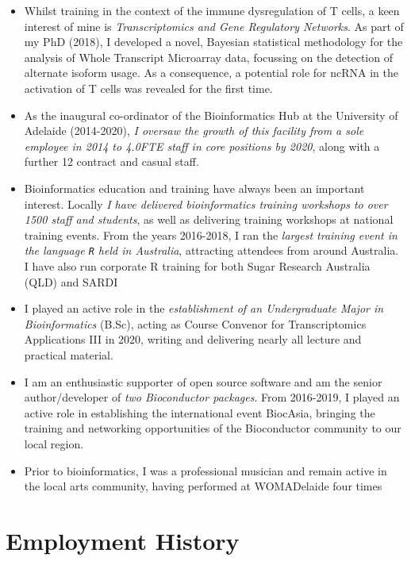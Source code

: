 \documentclass[11pt,a4paper,]{moderncv}
\providecommand{\tightlist}{%
	\setlength{\itemsep}{0pt}\setlength{\parskip}{0pt}}
\begin{document}
\begin{itemize}
\tightlist
\item
  Whilst training in the context of the immune dysregulation of T cells,
  a keen interest of mine is \emph{Transcriptomics and Gene Regulatory
  Networks}. As part of my PhD (2018), I developed a novel, Bayesian
  statistical methodology for the analysis of Whole Transcript
  Microarray data, focussing on the detection of alternate isoform
  usage. As a consequence, a potential role for ncRNA in the activation
  of T cells was revealed for the first time.
\item
  As the inaugural co-ordinator of the Bioinformatics Hub at the
  University of Adelaide (2014-2020), \emph{I oversaw the growth of this
  facility from a sole employee in 2014 to 4.0FTE staff in core
  positions by 2020}, along with a further 12 contract and casual staff.
\item
  Bioinformatics education and training have always been an important
  interest. Locally \emph{I have delivered bioinformatics training
  workshops to over 1500 staff and students}, as well as delivering
  training workshops at national training events. From the years
  2016-2018, I ran the \emph{largest training event in the language
  \texttt{R} held in Australia}, attracting attendees from around
  Australia. I have also run corporate R training for both Sugar
  Research Australia (QLD) and SARDI
\item
  I played an active role in the \emph{establishment of an Undergraduate
  Major in Bioinformatics} (B.Sc), acting as Course Convenor for
  Transcriptomics Applications III in 2020, writing and delivering
  nearly all lecture and practical material.
\item
  I am an enthusiastic supporter of open source software and am the
  senior author/developer of \emph{two Bioconductor packages}. From
  2016-2019, I played an active role in establishing the international
  event BiocAsia, bringing the training and networking opportunities of
  the Bioconductor community to our local region.
\item
  Prior to bioinformatics, I was a professional musician and remain
  active in the local arts community, having performed at WOMADelaide
  four times
\end{itemize}

\small

\hypertarget{employment-history}{%
\section{Employment History}\label{employment-history}}
\end{document}
